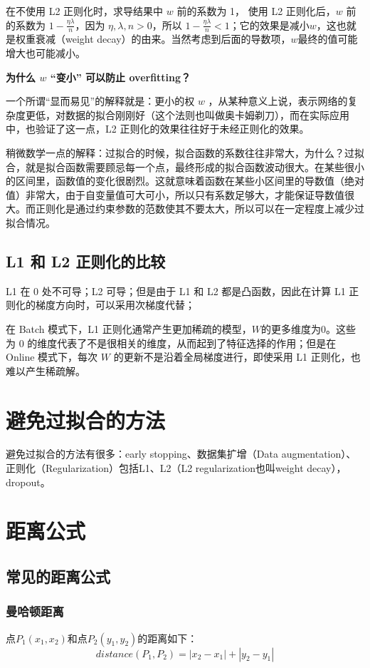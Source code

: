 \documentclass[12pt]{article}
\begin{document}
在不使用 L2 正则化时，求导结果中 $w$ 前的系数为 1， 使用 L2 正则化后，$w$ 前的系数为 $1-\frac{\eta\lambda}{n}$，因为 $\eta, \lambda, n > 0$，所以 $1-\frac{\eta\lambda}{n} < 1$；它的效果是减小$w$，这也就是权重衰减（weight decay）的由来。当然考虑到后面的导数项，$w$最终的值可能增大也可能减小。

\textbf{为什么 $w$ “变小” 可以防止 overfitting？}

一个所谓“显而易见”的解释就是：更小的权 
$w$ ，从某种意义上说，表示网络的复杂度更低，对数据的拟合刚刚好（这个法则也叫做奥卡姆剃刀），而在实际应用中，也验证了这一点，L2 正则化的效果往往好于未经正则化的效果。

稍微数学一点的解释：过拟合的时候，拟合函数的系数往往非常大，为什么？过拟合，就是拟合函数需要顾忌每一个点，最终形成的拟合函数波动很大。在某些很小的区间里，函数值的变化很剧烈。这就意味着函数在某些小区间里的导数值（绝对值）非常大，由于自变量值可大可小，所以只有系数足够大，才能保证导数值很大。而正则化是通过约束参数的范数使其不要太大，所以可以在一定程度上减少过拟合情况。

\subsection{L1 和 L2 正则化的比较}
L1 在 0 处不可导；L2 可导；但是由于 L1 和 L2 都是凸函数，因此在计算 L1 正则化的梯度方向时，可以采用次梯度代替；

在 Batch 模式下，L1 正则化通常产生更加稀疏的模型，$W$的更多维度为0。这些为 0 的维度代表了不是很相关的维度，从而起到了特征选择的作用；但是在 Online 模式下，每次 $W$ 的更新不是沿着全局梯度进行，即使采用 L1 正则化，也难以产生稀疏解。

\section{避免过拟合的方法}
避免过拟合的方法有很多：early stopping、数据集扩增（Data augmentation）、正则化（Regularization）包括L1、L2（L2 regularization也叫weight decay），dropout。

\section{距离公式}
\subsection{常见的距离公式}
\subsubsection{曼哈顿距离}
点$P_1(x_1, x_2)$和点$P_2(y_1, y_2)$的距离如下：
$$
distance(P_1, P_2) = |x_2 - x_1| + |y_2 - y_1|
$$
\end{document}
